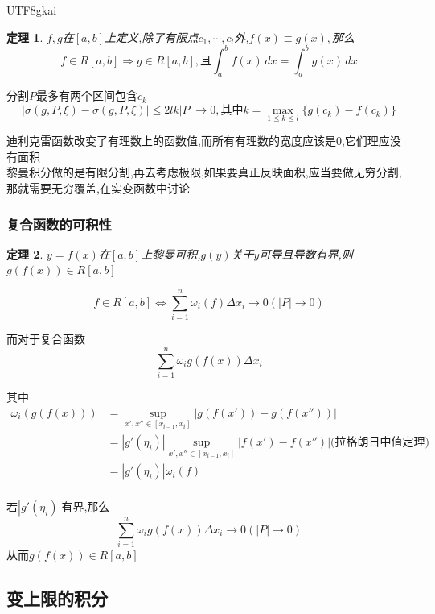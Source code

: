 \documentclass{article}
\newtheorem{theorem}{定理}[subsection]
\newenvironment{cproof}{%
\heiti{证明}\kaishu
}{%
}
\newcommand{\parameter}[1]{\left(#1\right)}
\newcommand{\abs}[1]{\left|#1\right|}
\begin{document}
\begin{CJK}{UTF8}{gkai}
\begin{theorem}
  $f,g$在$[a,b]$上定义,除了有限点$c_1,\cdots ,c_l$外,$f(x) \equiv g(x),$那么\[f\in R[a,b] \Rightarrow g \in R[a,b] ,\text{且}\int_{a}^{b}f(x)\, dx = \int_{a}^{b}g(x)\, dx \]
\end{theorem}

\begin{cproof}
  分割$P$最多有两个区间包含$c_k$
  \[\abs{\sigma(g,P,\xi) - \sigma(g,P,\xi)} \leq 2lk |P| \rightarrow 0,\text{其中}k = \max_{1\leq k\leq l}\{g(c_k) - f(c_k)\}\]
\end{cproof}

迪利克雷函数改变了有理数上的函数值,而所有有理数的宽度应该是0,它们理应没有面积\\
黎曼积分做的是有限分割,再去考虑极限,如果要真正反映面积,应当要做无穷分割,那就需要无穷覆盖,在实变函数中讨论\\
\subsubsection{复合函数的可积性}
\begin{theorem}
  
  $y = f(x)$在$[a,b]$上黎曼可积,$g(y)$关于$y$可导且导数有界,则$g(f(x))\in R[a,b]$
  
\end{theorem}

\begin{cproof}
\[f\in R[a,b] \Leftrightarrow \sum_{i =1}^{n} \omega_i(f) \Delta x_i \to 0 (|P| \to 0)\]

而对于复合函数
\[\sum_{i =1}^{n} \omega_i g(f(x)) \Delta x_i \]

其中
\[
\begin{aligned}  
  \omega_i(g(f(x))) &= \sup_{x',x''\in[x_{i - 1},x_i]} \abs{g\parameter{f(x')} - g\parameter{f(x'')}}\\
  &= |g'(\eta_i)| \sup_{x',x''\in[x_{i - 1},x_i]} \abs{f(x') - f(x'')}\text{(拉格朗日中值定理)}\\
  &= |g'(\eta_i)| \omega_i(f)\\
\end{aligned}  
  \]


若$|g'(\eta_i)|$有界,那么 \[\sum_{i =1}^{n} \omega_i g(f(x)) \Delta x_i  \to 0(|P| \to 0)\]
从而$g(f(x))\in R[a,b]$
\end{cproof}

\subsection{变上限的积分}


\end{CJK}
\end{document}
